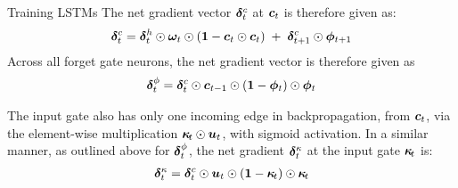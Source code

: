 \begin{frame}{Training LSTMs}
The net gradient vector ${\bm \delta}^c_t$ at ${\boldsymbol c}_t$ is therefore given as:
\begin{align*}
    {\bm \delta}_t^c = {\bm \delta}_t^h \odot {\bm \omega}_t \odot (\mathbf{1} - {\boldsymbol c}_t
    \odot {\boldsymbol c}_t) \; +\; {\bm \delta}_{t+1}^c \odot {\bm \phi}_{t+1}
\end{align*}
%
Across all forget gate neurons, the net gradient vector is therefore
given as
\begin{align*}
    {\bm \delta}_t^\phi = {\bm \delta}_t^c \odot {\boldsymbol c}_{t-1} \odot  (\mathbf{1} - {\bm \phi}_t) \odot {\bm \phi}_t
\end{align*}

The input gate also has only one incoming edge in backpropagation, from
${\boldsymbol c}_t$, via the element-wise multiplication ${\bm \kappa}_{\!t} \odot
{\boldsymbol u}_{t}$, with sigmoid activation. In a similar manner, as outlined above
for ${\bm \delta}_t^\phi$, the net gradient ${\bm \delta}_t^\kappa$ at the input
gate ${\bm \kappa}_{\!t}$ is:
\begin{align*}
    {\bm \delta}_t^\kappa = {\bm \delta}_t^c \odot {\boldsymbol u}_t \odot  (\mathbf{1} -
    {\bm \kappa}_{\!t}) \odot {\bm \kappa}_{\!t}
\end{align*}
\end{frame}

